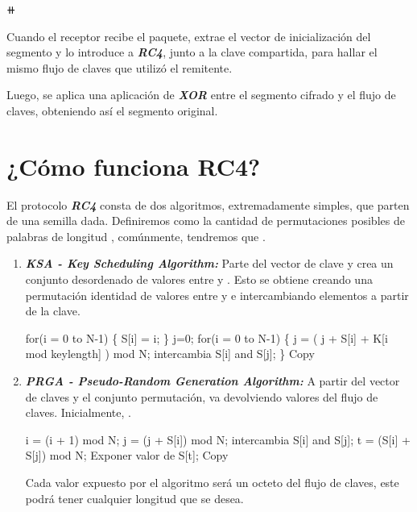 \documentclass[
]{article}
\newenvironment{Shaded}{}{}
\newcommand{\NormalTok}[1]{#1}
\begin{document}
⧺

Cuando el receptor recibe el paquete, extrae el vector de inicialización
del segmento y lo introduce a \textbf{\emph{RC4}}, junto a la clave
compartida, para hallar el mismo flujo de claves que utilizó el
remitente.

Luego, se aplica una aplicación de \textbf{\emph{XOR}} entre el segmento
cifrado y el flujo de claves, obteniendo así el segmento original.

\hypertarget{cuxf3mo-funciona-rc4}{%
\section{¿Cómo funciona RC4?}\label{cuxf3mo-funciona-rc4}}

El protocolo \textbf{\emph{RC4}} consta de dos algoritmos,
extremadamente simples, que parten de una semilla dada. Definiremos {}
como la cantidad de permutaciones posibles de palabras de longitud {},
comúnmente, tendremos que {}.

\begin{enumerate}
\item
  \textbf{\emph{KSA - Key Scheduling Algorithm:}} Parte del vector de
  clave y crea un conjunto desordenado {} de valores entre {} y {}. Esto
  se obtiene creando una permutación identidad de valores entre {} y {}
  e intercambiando elementos a partir de la clave.

\begin{Shaded}
\begin{Highlighting}[]
\NormalTok{for(i = 0 to N{-}1)}
\NormalTok{\{}
\NormalTok{   S[i] = i;}
\NormalTok{\}}
\NormalTok{j=0;}
\NormalTok{for(i = 0 to N{-}1)}
\NormalTok{\{}
\NormalTok{   j = ( j + S[i] + K[i mod keylength] ) mod N;}
\NormalTok{   intercambia S[i] and S[j];}
\NormalTok{\}}
\NormalTok{Copy}
\end{Highlighting}
\end{Shaded}
\item
  \textbf{\emph{PRGA - Pseudo-Random Generation Algorithm:}} A partir
  del vector de claves y el conjunto permutación, va devolviendo valores
  del flujo de claves. Inicialmente, {}.

\begin{Shaded}
\begin{Highlighting}[]
\NormalTok{i = (i + 1) mod N;}
\NormalTok{j = (j + S[i]) mod N;}
\NormalTok{intercambia S[i] and S[j];}
\NormalTok{t = (S[i] + S[j]) mod N;}
\NormalTok{Exponer valor de S[t];}
\NormalTok{Copy}
\end{Highlighting}
\end{Shaded}

  Cada valor expuesto por el algoritmo será un octeto del flujo de
  claves, este podrá tener cualquier longitud que se desea.
\end{enumerate}
\end{document}
